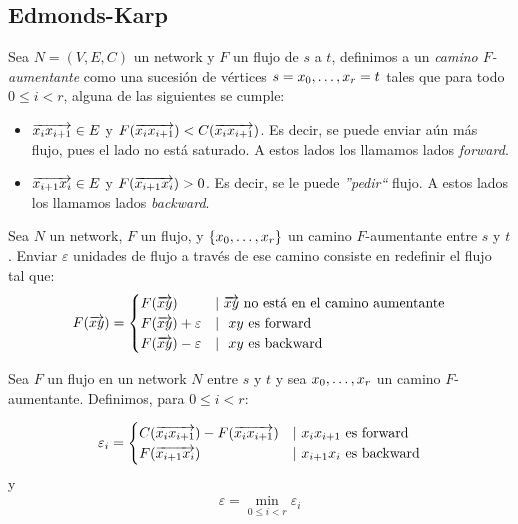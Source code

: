 \subsection{Edmonds-Karp}

\begin{definition}
  Sea $N = (V,E,C)$ un network y $F$ un flujo de $s$ a $t$, definimos a un
  \emph{camino $F$-aumentante} como una sucesión de vértices
  $s = x_0, \mathellipsis, x_r = t$ tales que para todo $0 \le i < r$, alguna
  de las siguientes se cumple:
  \begin{itemize}
  \item $\overrightarrow{x_i x_{i+1}} \in E$ y
    $F(\overrightarrow{x_i x_{i+1}}) < C(\overrightarrow{x_i x_{i+1}})$. Es decir, se puede enviar aún
    más flujo, pues el lado no está saturado. A estos lados los llamamos lados
    \emph{forward}.
  \item $\overrightarrow{x_{i+1} x_i} \in E$ y $F(\overrightarrow{x_{i+1} x_i}) > 0$. Es decir, se le
    puede \emph{''pedir``} flujo. A estos lados los llamamos lados
    \emph{backward}.
  \end{itemize}
\end{definition}

\begin{definition}
  Sea $N$ un network, $F$ un flujo, y $\{x_0,\mathellipsis,x_r\}$ un camino
  $F$-aumentante entre $s$ y $t$. Enviar $\varepsilon$ unidades de flujo a
  través de ese camino consiste en redefinir el flujo tal que:
  \begin{align}
    F(\overrightarrow{xy}) =
    \begin{cases}
      F(\overrightarrow{xy}) & |\ \text{$\overrightarrow{xy}$ no está en el camino aumentante}\\
      F(\overrightarrow{xy}) + \varepsilon & |\ \text{ $xy$ es forward}\\
      F(\overrightarrow{xy}) - \varepsilon & |\ \text{ $xy$ es backward}
    \end{cases}
  \end{align}
\end{definition}

\begin{definition}
  Sea $F$ un flujo en un network $N$ entre $s$ y $t$ y sea
  $x_0, \mathellipsis, x_r$ un camino $F$-aumentante.
  Definimos, para $0 \le i < r:$
  
  \begin{align}
    \varepsilon_i = 
    \begin{cases}
      C(\overrightarrow{x_ix_{i+1}}) - F(\overrightarrow{x_ix_{i+1}}) & |\ x_ix_{i+1} \text{ es forward}\\
      F(\overrightarrow{x_{i+1} x_i}) & |\ x_{i+1}x_i \text{ es backward}
    \end{cases}
  \end{align}
  y
  \begin{align}
    \varepsilon = \min_{0 \le i < r} \varepsilon_i
  \end{align}
\end{definition}

